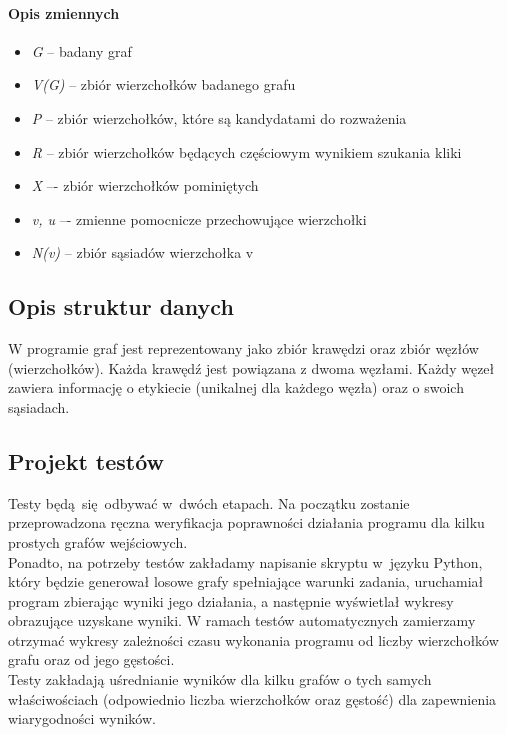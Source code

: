 \documentclass[11pt,a4paper]{article}
\begin{document}
\paragraph{Opis zmiennych}
\begin{itemize}
  \item \textit{G} -- badany graf
  \item \textit{V(G)} -- zbiór wierzchołków badanego grafu
  \item \textit{P} -- zbiór wierzchołków, które są kandydatami do rozważenia
  \item \textit{R} -- zbiór wierzchołków będących częściowym wynikiem szukania kliki
  \item \textit{X} –- zbiór wierzchołków pominiętych
  \item \textit{v, u} –- zmienne pomocnicze przechowujące wierzchołki
  \item \textit{N(v)} -- zbiór sąsiadów wierzchołka v
\end{itemize}

\subsection{Opis struktur danych}
W programie graf jest reprezentowany jako zbiór krawędzi oraz zbiór węzłów (wierzchołków). Każda krawędź jest powiązana z dwoma węzłami. Każdy węzeł zawiera informację o etykiecie (unikalnej dla każdego węzła) oraz o swoich sąsiadach.

\subsection{Projekt testów}
Testy będą się odbywać w~dwóch etapach. Na początku zostanie przeprowadzona ręczna weryfikacja poprawności działania programu dla kilku prostych grafów wejściowych.\\

Ponadto, na potrzeby testów zakładamy napisanie skryptu w~języku Python, który będzie generował losowe grafy spełniające warunki zadania, uruchamiał program zbierając wyniki jego działania, a następnie wyświetlał wykresy obrazujące uzyskane wyniki. W ramach testów automatycznych zamierzamy otrzymać wykresy zależności czasu wykonania programu od liczby wierzchołków grafu oraz od jego gęstości.\\

Testy zakładają uśrednianie wyników dla kilku grafów o tych samych właściwościach (odpowiednio liczba wierzchołków oraz gęstość) dla zapewnienia wiarygodności wyników.
\end{document}
